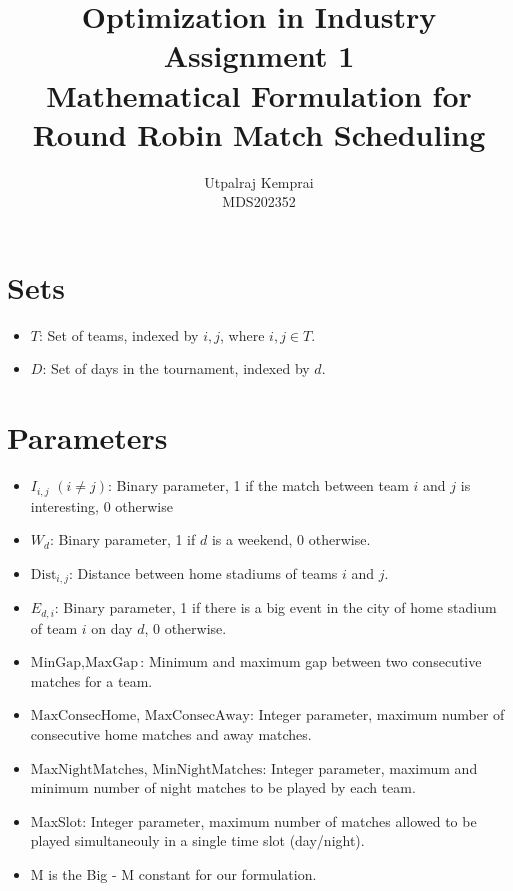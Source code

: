 \documentclass[a4paper, 12pt]{article}
\title{Optimization in Industry Assignment 1 \\ Mathematical Formulation for Round Robin Match Scheduling}
\author{Utpalraj Kemprai \\ MDS202352}
\date{}
\begin{document}
\maketitle

\section*{Sets}
\begin{itemize}
    \item $T$: Set of teams, indexed by $i, j$, where $i, j \in T$.
    \item $D$: Set of days in the tournament, indexed by $d$.
\end{itemize}

\section*{Parameters}
\begin{itemize}
    \item $I_{i,j}$ $(i \neq j)$: Binary parameter, 1 if the match between team $i$ and $j$ is interesting, 0 otherwise
    \item $W_{d}$: Binary parameter, 1 if $d$ is a weekend, 0 otherwise.
    \item $\text{Dist}_{i,j}$: Distance between home stadiums of teams $i$ and $j$.
    \item $E_{d,i}$: Binary parameter, 1 if there is a big event in the city of home stadium of team $i$ on day $d$, 0 otherwise.
    \item $\text{MinGap}, \text{MaxGap}$: Minimum and maximum gap between two consecutive matches for a team.
    \item $\text{MaxConsecHome}$, $\text{MaxConsecAway}$: Integer parameter, maximum number of consecutive home matches and away matches.
    \item $\text{MaxNightMatches}$, $\text{MinNightMatches}$: Integer parameter, maximum and minimum number of night matches to be played by each team.
    \item MaxSlot: Integer parameter, maximum number of matches allowed to be played simultaneouly in a single time slot (day/night).
    \item M is the Big - M constant for our formulation.
\end{itemize}
\end{document}
